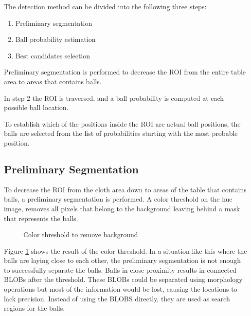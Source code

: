 The detection method can be divided into the following three steps:
\begin{enumerate}
  \item Preliminary segmentation
  \item Ball probability estimation
  \item Best candidates selection
\end{enumerate}

Preliminary segmentation is performed to decrease the ROI from the entire table area to areas that contains balls.

In step 2 the ROI is traversed, and a ball probability is computed at each possible ball location. 

To establish which of the positions inside the ROI are actual ball positions, the balls are selected from the list of probabilities starting with the most probable position.

\subsection{Preliminary Segmentation}
To decrease the ROI from the cloth area down to areas of the table that contains balls, a preliminary segmentation is performed. A color threshold on the hue image, removes all pixels that belong to the background leaving behind a mask that represents the balls.
\begin{figure}[htpb]
  \centering
  \quad           
   \caption{Color threshold to remove background}
  \label{fig:thres1}
\end{figure}
Figure \ref{fig:thres1} shows the result of the color threshold. In a situation like this where the balls are laying close to each other, the preliminary segmentation is not enough to successfully separate the balls. Balls in close proximity results in connected BLOBs after the threshold. These BLOBs could be separated using morphology operations but most of the information would be lost, causing the locations to lack precision. Instead of using the BLOBS directly, they are used as search regions for the balls.

